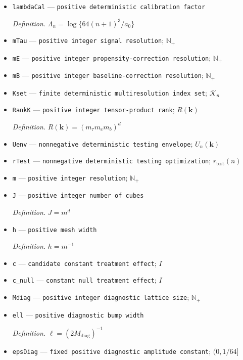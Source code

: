 \documentclass{article}
\begin{document}
\begin{itemize}
  \item \texttt{lambdaCal} --- \texttt{positive deterministic calibration factor}
  \par\smallskip\noindent\emph{Definition.} \(\Lambda_n=\log\{64(n+1)^3/a_0\}\)
  \item \texttt{mTau} --- \texttt{positive integer signal resolution}; \(\mathbb N_{+}\)
  \item \texttt{mE} --- \texttt{positive integer propensity-\allowbreak{}correction resolution}; \(\mathbb N_{+}\)
  \item \texttt{mB} --- \texttt{positive integer baseline-\allowbreak{}correction resolution}; \(\mathbb N_{+}\)
  \item \texttt{Kset} --- \texttt{finite deterministic multiresolution index set}; \(\mathcal K_n\)
  \item \texttt{RankK} --- \texttt{positive integer tensor-\allowbreak{}product rank}; \(R(\mathbf k)\)
  \par\smallskip\noindent\emph{Definition.} \(R(\mathbf k)=(m_\tau m_e m_b)^d\)
  \item \texttt{Uenv} --- \texttt{nonnegative deterministic testing envelope}; \(U_n(\mathbf k)\)
  \item \texttt{rTest} --- \texttt{nonnegative deterministic testing optimization}; \(r_{\mathrm{test}}(n)\)
  \item \texttt{m} --- \texttt{positive integer resolution}; \(\mathbb N_{+}\)
  \item \texttt{J} --- \texttt{positive integer number of cubes}
  \par\smallskip\noindent\emph{Definition.} \(J=m^d\)
  \item \texttt{h} --- \texttt{positive mesh width}
  \par\smallskip\noindent\emph{Definition.} \(h=m^{-1}\)
  \item \texttt{c} --- \texttt{candidate constant treatment effect}; \(I\)
  \item \texttt{c\_\allowbreak{}null} --- \texttt{constant null treatment effect}; \(I\)
  \item \texttt{Mdiag} --- \texttt{positive integer diagnostic lattice size}; \(\mathbb N_{+}\)
  \item \texttt{ell} --- \texttt{positive diagnostic bump width}
  \par\smallskip\noindent\emph{Definition.} \(\ell=(2M_{\mathrm{diag}})^{-1}\)
  \item \texttt{epsDiag} --- \texttt{fixed positive diagnostic amplitude constant}; \((0,1/64]\)

\end{itemize}
\end{document}
